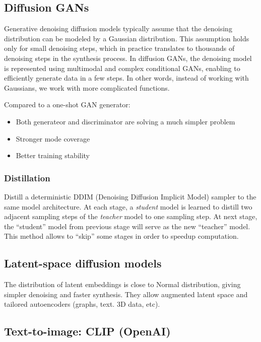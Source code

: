\documentclass[11pt]{article}
\begin{document}
\subsection{Diffusion GANs}\label{diffusion-gans}

Generative denoising diffusion models typically assume that the
denoising distribution can be modeled by a Gaussian distribution. This
assumption holds only for small denoising steps, which in practice
translates to thousands of denoising steps in the synthesis process. In
diffusion GANs, the denoising model is represented using multimodal and
complex conditional GANs, enabling to efficiently generate data in a few
steps. In other words, instead of working with Gaussians, we work with
more complicated functions.

Compared to a one-shot GAN generator:

\begin{itemize}
\tightlist
\item
  Both generateor and discriminator are solving a much simpler problem
\item
  Stronger mode coverage
\item
  Better training stability
\end{itemize}

\subsubsection{Distillation}\label{distillation}

Distill a deterministic DDIM (Denoising Diffusion Implicit Model)
sampler to the same model architecture. At each stage, a \emph{student}
model is learned to distill two adjacent sampling steps of the
\emph{teacher} model to one sampling step. At next stage, the
``student'' model from previous stage will serve as the new ``teacher''
model. This method allows to ``skip'' some stages in order to speedup
computation.

\subsection{Latent-space diffusion
models}\label{latent-space-diffusion-models}

The distribution of latent embeddings is close to Normal distribution,
giving simpler denoising and faster synthesis. They allow augmented
latent space and tailored autoencoders (graphs, text. 3D data, etc).

\subsection{Text-to-image: CLIP
(OpenAI)}\label{text-to-image-clip-openai}
\end{document}
